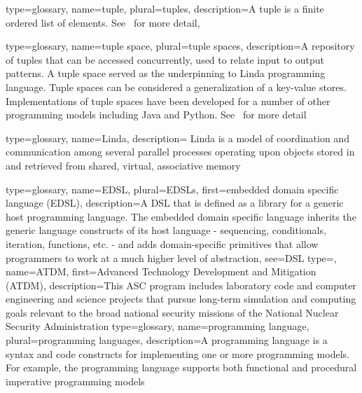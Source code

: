 {
  type={glossary},
  name={tuple},
  plural={tuples},
  description={A tuple is a finite ordered list of elements.  See~\cite{tuple}
  for more detail},
}

{
  type={glossary},
  name={tuple space},
  plural={tuple spaces},
  description={A repository of \glspl{tuple} that can be
  accessed concurrently, used to relate input to output patterns. A tuple
  space served as the underpinning to \gls{Linda} \gls{programming
  language}. Tuple spaces can be considered a generalization of a
  \glspl{key-value store}. Implementations of tuple spaces have 
  been developed for a number of other
  programming models including Java and Python.  See~\cite{tupleSpace} for
  more detail} 
}

{
  type={glossary},
  name={Linda},
  description={ Linda is a model of coordination and communication among several parallel
      processes operating upon objects stored in and retrieved from shared,
    virtual, associative memory~\cite{Linda}}
}



{
  type=glossary,
  name={EDSL},
  plural={EDSLs},
  first={embedded domain specific language (EDSL)},
  description={A \gls{DSL} that is defined as a library for a
    generic host programming language. The embedded domain specific language
      inherits the generic language constructs of its host language -
      sequencing, conditionals, iteration, functions, etc. - and adds
      domain-specific primitives that allow programmers to work at a much
      higher level of abstraction},
  see={DSL}
}
{
  type=\acronymtype,
  name={ATDM},
  first={Advanced Technology Development and Mitigation (ATDM)},
  description={This \gls{ASC} program includes laboratory code and computer engineering and science projects that pursue long-term simulation and computing goals relevant to the broad national security missions of the National Nuclear Security Administration}
}
{
  type=glossary,
  name={programming language},
  plural={programming languages},
  description={A programming language is a syntax and code constructs for
    implementing one or more \glspl{programming model}.
  For example, the \CC{} programming language supports both \gls{functional} and
    \gls{procedural} \gls{imperative} \glspl{programming model}}
}

